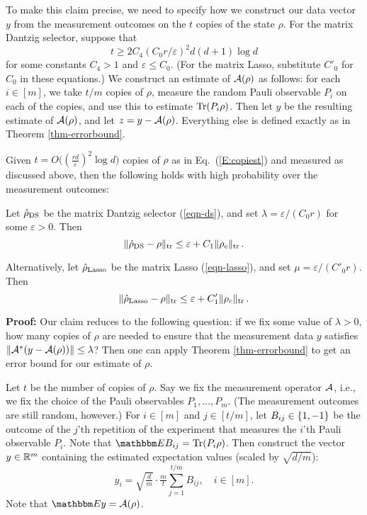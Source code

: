 To make this claim precise, we need to specify how we construct our data vector $y$ from the measurement outcomes on the $t$ copies of the state $\rho$. For the matrix Dantzig selector, suppose that 
\begin{equation}\label{E:copiest}
t \geq 2 C_4 (C_0 r/\varepsilon)^2 d(d+1) \log d
\end{equation}
for some constants $C_4 > 1$ and $\varepsilon \leq C_0$. (For the matrix Lasso, substitute $C'_0$ for $C_0$ in these equations.)
We construct an estimate of $\mathcal{A}(\rho)$ as follows: for each $i \in [m]$, we take $t/m$ copies of $\rho$, measure the random Pauli observable $P_i$ on each of the copies, and use this to estimate $\mathrm{Tr}(P_i\rho)$.  Then let $y$ be the resulting estimate of $\mathcal{A}(\rho)$, and let $z = y - \mathcal{A}(\rho)$. Everything else is defined exactly as in Theorem \ref{thm-errorbound}.

\begin{theorem}\label{thm-samplecomplexity}
Given $t = O\bigl((\tfrac{rd}{\varepsilon})^2 \log d\bigr)$ copies of $\rho$ as in Eq.~(\ref{E:copiest}) and measured as discussed above, then the following holds with high probability over the measurement outcomes:

Let $\hat{\rho}_{\mathrm{DS}}$ be the matrix Dantzig selector (\ref{eqn-ds}), and set $\lambda = \varepsilon/(C_0 r)$ for some $\varepsilon > 0$.  Then 
\begin{equation*}
	\lVert\hat{\rho}_{\mathrm{DS}} - \rho\rVert_{\mathrm{tr}} \leq \varepsilon + C_1 \lVert\rho_c\rVert_{\mathrm{tr}}\,.
\end{equation*}

Alternatively, let $\hat{\rho}_{\mathrm{Lasso}}$ be the matrix Lasso (\ref{eqn-lasso}), and set $\mu = \varepsilon/(C'_0 r)$.  Then 
\begin{equation*}
	\lVert\hat{\rho}_{\mathrm{Lasso}} - \rho\rVert_{\mathrm{tr}} \leq \varepsilon + C'_1 \lVert\rho_c\rVert_{\mathrm{tr}}\,.
\end{equation*}
\end{theorem}

\textbf{Proof:} Our claim reduces to the following question:  if we fix some value of $\lambda > 0$, how many copies of $\rho$ are needed to ensure that the measurement data $y$ satisfies $\lVert\mathcal{A}^*(y-\mathcal{A}(\rho))\rVert \leq \lambda$?  Then one can apply Theorem \ref{thm-errorbound} to get an error bound for our estimate of $\rho$.

Let $t$ be the number of copies of $\rho$.  Say we fix the measurement operator $\mathcal{A}$, i.e., we fix the choice of the Pauli observables $P_1,\ldots,P_m$.  (The measurement outcomes are still random, however.)  For $i \in [m]$ and $j \in [t/m]$, let $B_{ij} \in \lbrace 1,-1 \rbrace$ be the outcome of the $j$'th repetition of the experiment that measures the $i$'th Pauli observable $P_i$.  Note that $\EE B_{ij} = \Tr(P_i\rho)$.  Then construct the vector $y \in \mathbb{R}^m$ containing the estimated expectation values (scaled by $\sqrt{d/m}$):
\begin{equation}
	y_i = \sqrt{\tfrac{d}{m}} \cdot \tfrac{m}{t} \sum_{j=1}^{t/m} B_{ij}, \quad i \in [m].
\end{equation}
Note that $\EE y = \calA(\rho)$.  

